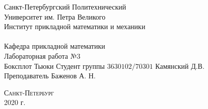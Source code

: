 \documentclass[a4]{article}
\begin{document}
\def\contentsname{\LARGE{Содержание}}
\thispagestyle{empty}
\begin{center} 
\vspace{2cm} 
{\Large \sc Санкт-Петербургский Политехнический}\\
\vspace{2mm}
{\Large \sc Университет} им. {\Large\sc Петра Великого}\\
\vspace{1cm}
{\large \sc Институт прикладной математики и механики\\ 
\vspace{0.5mm}
\textsc{}}\\ 
\vspace{0.5mm}
{\large\sc Кафедра прикладной математики}\\
\vspace{15mm}
{\huge \sc Лабораторная работа №$3$\\
\vspace{4mm}
Боксплот Тьюки
\vspace{6mm}
 }
\vspace*{2mm}
\vspace{6cm} 
Студент группы $3630102/70301$ \hfill Камянский Д.В.\\
\vspace{1cm}
Преподаватель \hfill Баженов А. Н.\\
\vspace{20mm} 


\vfill {\large\textsc{Санкт-Петербург}}\\ 
2020 г.
\end{center}


\newpage
\pagestyle{plain}

\end{document}
